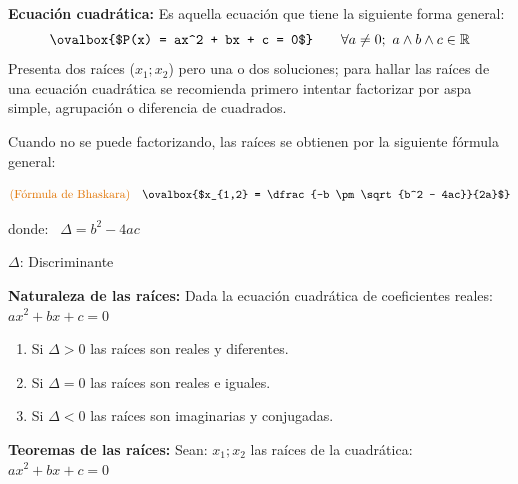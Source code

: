 \documentclass[11pt,a4paper]{article}
\newcommand{\hl}[1]{\textcolor{resaltado}{#1}}
\begin{document}
\textcolor{azul}{\textbf{Ecuación cuadrática:}} Es aquella ecuación que tiene la siguiente
forma general:
\[\ovalbox{$P(x) = ax^2 + bx + c = 0$} \qquad \forall a \neq 0;\ a \wedge b \wedge c \in \mathbb{R}\]
Presenta dos raíces ($x_1; x_2$) pero una o dos soluciones; para hallar las raíces de una
ecuación cuadrática se recomienda primero intentar factorizar por aspa simple, agrupación
o diferencia de cuadrados.

Cuando no se puede factorizando, las raíces se obtienen por la siguiente
\hl{fórmula general}:

\begin{minipage}{0.582\textwidth}
\[
\text{\textcolor{naranja}{(Fórmula de Bhaskara)}}\quad
\ovalbox{$x_{1,2} = \dfrac{-b \pm \sqrt{b^2 - 4ac}}{2a}$}
\]
\end{minipage}\hfill
\begin{minipage}{0.388\textwidth}
donde: \ $\Delta = b^2 - 4ac$

\textcolor{rojo}{$\Delta$}: Discriminante
\end{minipage}

\medskip
\textbf{Naturaleza de las raíces:} Dada la ecuación cuadrática de coeficientes reales:
$ax^2 + bx + c = 0$
\begin{enumerate}[label=\Roman*.]
  \item Si $\Delta > 0$ las raíces son reales y diferentes.
  \item Si $\Delta = 0$ las raíces son reales e iguales.
  \item Si $\Delta < 0$ las raíces son imaginarias y conjugadas.
\end{enumerate}

\textbf{Teoremas de las raíces:} Sean: $x_1; x_2$ las raíces de la cuadrática:
$ax^2 + bx + c = 0$
\end{document}
